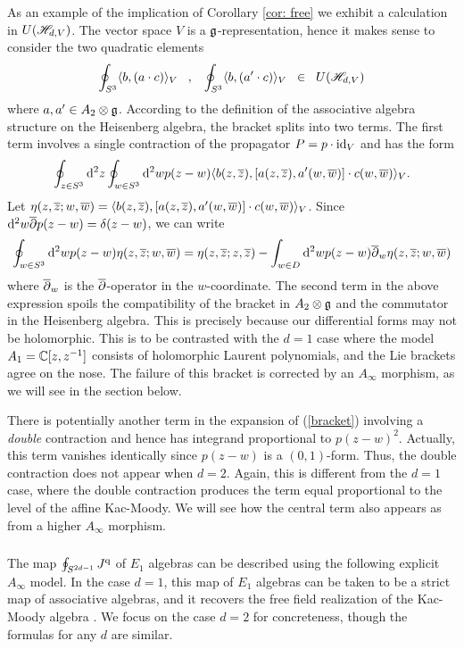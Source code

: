 \begin{eg}\label{eg: contract}
As an example of the implication of Corollary \ref{cor: free} we exhibit a calculation in $U(\mathscr H_{d,V})$. 
The vector space $V$ is a $\mathfrak g$-representation, hence it makes sense to consider the two quadratic elements 
\[
\oint_{S^3} \langle b, (a \cdot c)\rangle_V \;\;\; , \;\;\; \oint_{S^3}\langle b, (a'\cdot c)\rangle_V \;\; \in \;\; U (\mathscr H_{d,V})
\]
where $a,a' \in A_2 \otimes \mathfrak g$. 
According to the definition of the associative algebra structure on the Heisenberg algebra, the bracket
\beqn\label{bracket}
\eeqn
splits into two terms.
The first term involves a single contraction of the propagator $P = p \cdot {\rm id}_V$ and has the form
\[
\oint_{z \in S^3} {\rm d}^2 z \oint_{w \in S^3} {\rm d}^2 w p(z-w) \langle b(z,\overline{z}), [a(z,\overline{z}), a'(w,\overline{w})] \cdot c(w,\overline{w})\rangle_V  .
\]
Let $\eta(z,\overline{z};w,\overline{w}) = \langle b(z,\overline{z}), [a(z,\overline{z}), a'(w,\overline{w})] \cdot c(w,\overline{w})\rangle_V$.
Since ${\rm d}^2 w \overline{\partial} p(z-w) = \delta(z-w)$, we can write 
\[
\oint_{w \in S^3} {\rm d}^2 w p(z-w) \eta(z,\overline{z};w,\overline{w}) = \eta(z,\overline{z};z,\overline{z})- \int_{w \in D} {\rm d}^2 w p(z-w) \overline{\partial}_w \eta(z,\overline{z};w,\overline{w})
\] 
where $\overline{\partial}_w$ is the $\overline{\partial}$-operator in the $w$-coordinate. 
The second term in the above expression spoils the compatibility of the bracket in $A_2 \otimes \mathfrak g$ and the commutator in the Heisenberg algebra.
This is precisely because our differential forms may not be holomorphic.
This is to be contrasted with the $d=1$ case where the model $A_1 = \mathbb C[z,z^{-1}]$ consists of holomorphic Laurent polynomials, and the Lie brackets agree on the nose. 
The failure of this bracket is corrected by an $A_\infty$ morphism, as we will see in the section below.

There is potentially another term in the expansion of (\ref{bracket}) involving a {\em double} contraction and hence has integrand proportional to $p(z-w)^2$. 
Actually, this term vanishes identically since $p(z-w)$ is a $(0,1)$-form. 
Thus, the double contraction does not appear when $d=2$.
Again, this is different from the $d=1$ case, where the double contraction produces the term equal proportional to the level of the affine Kac-Moody. 
We will see how the central term also appears as from a higher $A_\infty$ morphism. 
\end{eg}

\subsubsection{}
The map $\oint_{S^{2d-1}} J^{\rm q}$ of $E_1$ algebras can be described using the following explicit $A_\infty$ model.
In the case $d=1$, this map of $E_1$ algebras can be taken to be a strict map of associative algebras, and it recovers the free field realization of the Kac-Moody algebra \cite{FrenkelFree}.
We focus on the case $d=2$ for concreteness, though the formulas for any $d$ are similar. 

